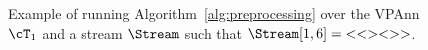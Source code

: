 \begin{figure}[t]
\begin{tikzpicture}[xscale=1.3,->,>=stealth',shorten >=1pt,auto,node distance=2cm,thick,inner sep=0.5pt, rectangle]
%		
%		
%		
%		
%		
%		
	\end{tikzpicture}
	\caption{Example of running Algorithm~\ref{alg:preprocessing} over the VPAnn $\cT_1$ and a stream $\Stream$ such that $\Stream[1,6] = {\tt < < > < > >}$.}
	\label{nested:fig-alg-ex}
\end{figure}
